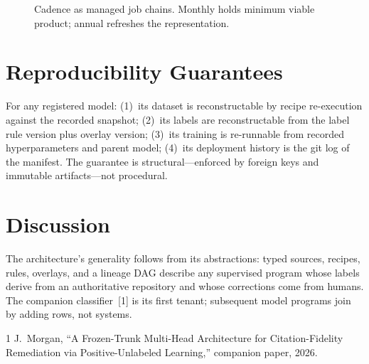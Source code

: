 \documentclass[conference]{IEEEtran}
\begin{document}
\begin{figure}[t]
\centering
{}
\caption{Cadence as managed job chains. Monthly holds minimum viable product; annual refreshes the representation.}
\label{fig:cadence}
\end{figure}

\section{Reproducibility Guarantees}
For any registered model: (1)~its dataset is reconstructable by recipe re-execution against the recorded snapshot; (2)~its labels are reconstructable from the label rule version plus overlay version; (3)~its training is re-runnable from recorded hyperparameters and parent model; (4)~its deployment history is the git log of the manifest. The guarantee is structural---enforced by foreign keys and immutable artifacts---not procedural.

\section{Discussion}
The architecture's generality follows from its abstractions: typed sources, recipes, rules, overlays, and a lineage DAG describe any supervised program whose labels derive from an authoritative repository and whose corrections come from humans. The companion classifier~[1] is its first tenant; subsequent model programs join by adding rows, not systems.

\begin{thebibliography}{1}
 J.~Morgan, ``A Frozen-Trunk Multi-Head Architecture for Citation-Fidelity Remediation via Positive-Unlabeled Learning,'' companion paper, 2026.
\end{thebibliography}
\end{document}
